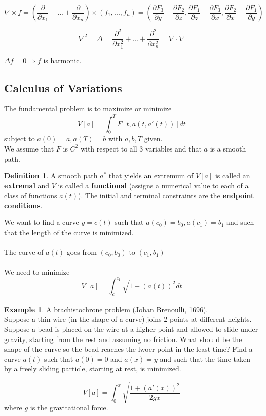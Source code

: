 \documentclass[12pt]{article}
\theoremstyle{plain}
\theoremstyle{definition}
\newtheorem{definition}[theorem]{Definition}
\newtheorem{example}[theorem]{Example}
\begin{document}
$$\nabla \times f = (\frac{\partial}{\partial x_1} + ... + \frac{\partial}{\partial x_n}) \times (f_1,...,f_n) = (\frac{\partial F_3}{\partial y} - \frac{\partial F_2}{\partial z}, \frac{\partial F_1}{\partial z} - \frac{\partial F_3}{\partial x}, \frac{\partial F_2}{\partial x} - \frac{\partial F_1}{\partial y})$$

$$\nabla^2 = \Delta = \frac{\partial^2}{\partial x_1^2} + ... + \frac{\partial^2}{\partial x_n^2} = \nabla \cdot \nabla$$

$\Delta f = 0 \Longrightarrow f$ is harmonic.

\subsection{Calculus of Variations}

The fundamental problem is to maximize or minimize
$$V[a]=\int^T_0 F[t, a(t, a'(t))]dt$$
subject to $a(0) = a, a(T)=b$ with $a,b,T$ given.\\
We assume that $F$ is $C^2$ with respect to all 3 variables and that $a$ is a smooth path.

\begin{definition}
	A smooth path $a^*$ that yields an extremum of $V[a]$ is called an \textbf{extremal} and $V$ is called a \textbf{functional} (assigns a numerical value to each of a class of functions $a(t)$). The initial and terminal constraints are the \textbf{endpoint conditions}.
\end{definition}

We want to find a curve $y=c(t)$ such that $a(c_0) = b_0, a(c_1) = b_1$ and such that the length of the curve is minimized.\\
\\
The curve of $a(t)$ goes from $(c_0, b_0)$ to $(c_1, b_1)$\\
\\
We need to minimize
$$V[a] = \int^{c_1}_{c_0} \sqrt{1 + (a (t))^2} dt$$

\begin{example}
	A brachistochrone problem (Johan Brenoulli, 1696).\\
	Suppose a thin wire (in the shape of a curve) joins 2 points at different heights. Suppose a bead is placed on the wire at a higher point and allowed to slide under gravity, starting from the rest and assuming no friction. What should be the shape of the curve so the bead reaches the lwoer point in the least time? Find a curve $a(t)$ such that $a(0)=0$ and $a(x)=y$ and such that the time taken by a freely sliding particle, starting at rest, is minimized.

	$$V[a] = \int^x_0 \sqrt{\frac{1+(a'(x))^2}{2 g x}}$$
	where $g$ is the gravitational force.
\end{example}
\end{document}
